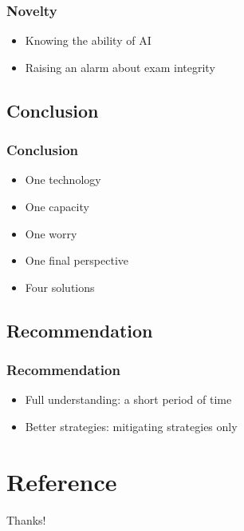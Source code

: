 \documentclass{beamer}
\begin{document}
\begin{frame}
    \frametitle{Novelty}
    \LARGE
    \begin{itemize}
        \item Knowing the ability of AI
        \item Raising an alarm about exam integrity
    \end{itemize}
\end{frame}

\subsection{Conclusion}
\begin{frame}
    \frametitle{Conclusion}
    \Large
    \begin{itemize}
        \item<1-> One technology
        \item<2-> One capacity
        \item<3-> One worry
        \item<4-> One final perspective
        \item<5-> Four solutions
    \end{itemize}
\end{frame}

\subsection{Recommendation}

\begin{frame}
    \frametitle{Recommendation}
    \LARGE
    \begin{itemize}[<+->]
        \item Full understanding: a short period of time
        \item Better strategies: mitigating strategies only
    \end{itemize}
\end{frame}

\section{Reference}

\begin{frame}[allowframebreaks]
    
    
\end{frame}

\begin{frame}
    \begin{center}
        {\Huge\calligra Thanks!}\cite{origin}
    \end{center}
\end{frame}
\end{document}
